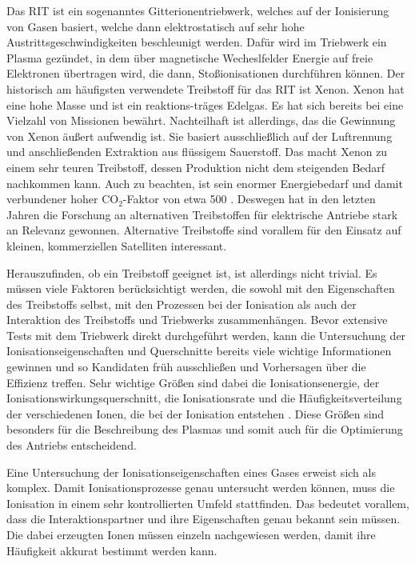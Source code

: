 Das RIT ist ein sogenanntes Gitterionentriebwerk, welches auf der Ionisierung von Gasen basiert, welche dann elektrostatisch auf sehr hohe Austrittsgeschwindigkeiten beschleunigt werden. Dafür wird im Triebwerk ein Plasma gezündet, in dem über magnetische Wecheslfelder Energie auf freie Elektronen übertragen wird, die dann, Stoßionisationen durchführen können. Der historisch am häufigsten verwendete Treibstoff für das RIT ist Xenon. Xenon hat eine hohe Masse und ist ein reaktions-träges Edelgas. Es hat sich bereits bei eine Vielzahl von Missionen bewährt. Nachteilhaft ist allerdings, das die Gewinnung von Xenon äußert aufwendig ist. Sie basiert ausschließlich auf der Luftrennung und anschließenden Extraktion aus flüssigem Sauerstoff. Das macht Xenon zu einem sehr teuren Treibstoff, dessen Produktion nicht dem steigenden Bedarf nachkommen kann. Auch zu beachten, ist sein enormer Energiebedarf und damit verbundener hoher CO$_2$-Faktor von etwa 500 \cite{CO2}. Deswegen hat in den letzten Jahren die Forschung an alternativen Treibstoffen für elektrische Antriebe stark an Relevanz gewonnen. Alternative Treibstoffe sind vorallem für den Einsatz auf kleinen, kommerziellen Satelliten interessant. 

Herauszufinden, ob ein Treibstoff geeignet ist, ist allerdings nicht trivial. Es müssen viele Faktoren berücksichtigt werden, die sowohl mit den Eigenschaften des Treibstoffs selbst, mit den Prozessen bei der Ionisation als auch der Interaktion des Treibstoffs und Triebwerks zusammenhängen. Bevor extensive Tests mit dem Triebwerk direkt durchgeführt werden, kann die Untersuchung der Ionisationseigenschaften und Querschnitte bereits viele wichtige Informationen gewinnen und so Kandidaten früh ausschließen und Vorhersagen über die Effizienz treffen. Sehr wichtige Größen sind dabei die Ionisationsenergie, der Ionisationswirkungsquerschnitt, die Ionisationsrate und die Häufigkeitsverteilung der verschiedenen Ionen, die bei der Ionisation entstehen \cite{ion}. Diese Größen sind besonders für die Beschreibung des Plasmas und somit auch für die Optimierung des Antriebs entscheidend.

Eine Untersuchung der Ionisationseigenschaften eines Gases erweist sich als komplex. Damit Ionisationsprozesse genau untersucht werden können, muss die Ionisation in einem sehr kontrollierten Umfeld stattfinden. Das bedeutet vorallem, dass die Interaktionspartner und ihre Eigenschaften genau bekannt sein müssen. Die dabei erzeugten Ionen müssen einzeln nachgewiesen werden, damit ihre Häufigkeit akkurat bestimmt werden kann. 

